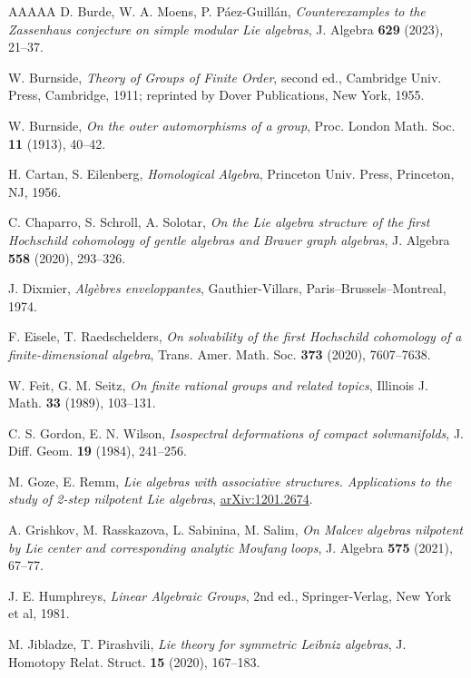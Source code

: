 \documentclass[11pt,reqno]{amsart}
\numberwithin{equation}{section}
\theoremstyle{definition}
\begin{document}
\begin{thebibliography}{AAAAA}
D. Burde, W. A. Moens, P. P\'aez-Guill\'an,
\emph{Counterexamples to the Zassenhaus conjecture on simple modular Lie algebras},
J. Algebra {\bf 629} (2023), 21--37.



W. Burnside,
\emph{Theory of Groups of Finite Order}, second ed.,
Cambridge Univ. Press, Cambridge, 1911;
reprinted by Dover Publications, New York, 1955.

W. Burnside,
\emph{On the outer automorphisms of a group},
Proc. London Math. Soc. {\bf 11} (1913), 40--42.



H. Cartan, S. Eilenberg,
{\it Homological Algebra},
Princeton Univ. Press, Princeton, NJ, 1956.


C. Chaparro, S. Schroll, A. Solotar,
{\it On the Lie algebra structure of the first Hochschild cohomology of gentle algebras and Brauer graph algebras},
J. Algebra {\bf 558} (2020), 293--326.


J. Dixmier,
{\it Alg\`ebres enveloppantes},
Gauthier-Villars, Paris--Brussels--Montreal, 1974.


F. Eisele, T. Raedschelders,
{\it On solvability of the first Hochschild cohomology of a finite-dimensional algebra},
Trans. Amer. Math. Soc. {\bf 373} (2020), 7607--7638.

W. Feit, G. M. Seitz,
\emph{On finite rational groups and related topics},
Illinois J. Math. {\bf 33} (1989), 103--131.

C. S. Gordon, E. N. Wilson,
\emph{Isospectral deformations of compact solvmanifolds},
J. Diff. Geom. {\bf 19} (1984), 241--256.

M. Goze, E. Remm,
{\it Lie algebras with associative structures. Applications to the study of 2-step nilpotent Lie algebras},
\url{arXiv:1201.2674}.

A. Grishkov, M. Rasskazova, L. Sabinina, M. Salim,
\emph{On Malcev algebras nilpotent by Lie center and corresponding analytic Moufang loops},
J. Algebra {\bf 575} (2021), 67--77.

J. E. Humphreys,
{\it Linear Algebraic Groups}, 2nd ed.,
Springer-Verlag, New York et al, 1981.

M. Jibladze, T. Pirashvili,
\emph{Lie theory for symmetric Leibniz algebras},
J. Homotopy Relat. Struct. {\bf 15} (2020), 167--183.


\end{thebibliography}
\end{document}
